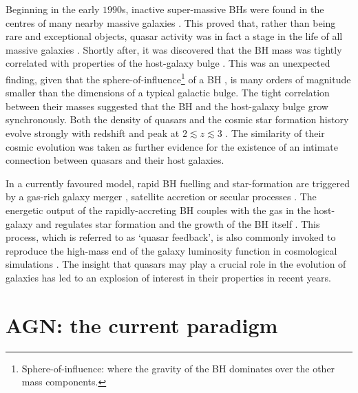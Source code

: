 Beginning in the early $1990$s, inactive super-massive BHs were found in the centres of many nearby massive galaxies \citep[e.g.][]{kormendy95,ferrarese05,kormendy13}.
This proved that, rather than being rare and exceptional objects, quasar activity was in fact a stage in the life of all massive galaxies \citep[e.g.][]{lynden-bell69}.
Shortly after, it was discovered that the BH mass was tightly correlated with properties of the host-galaxy bulge \citep[e.g. the stellar velocity dispersion, $\sigma$, which is proportional to the bulge mass; e.g.][]{magorrian98,ferrarese00,gebhardt00,graham01,tremaine02,marconi03,aller07,gultekin09}.
This was an unexpected finding, given that the sphere-of-influence\footnote{Sphere-of-influence: where the gravity of the BH dominates over the other mass components.} of a BH \citep[$\lesssim100$ parsecs; e.g.][]{kormendy13}, is many orders of magnitude smaller than the dimensions of a typical galactic bulge.
The tight correlation between their masses suggested that the BH and the host-galaxy bulge grow synchronously.
Both the density of quasars and the cosmic star formation history evolve strongly with redshift and peak at $2 \lesssim z \lesssim 3$ \citep[e.g.][]{boyle98,brandt05,richards06b}.
The similarity of their cosmic evolution was taken as further evidence for the existence of an intimate connection between quasars and their host galaxies.

In a currently favoured model, rapid BH fuelling and star-formation are triggered by a gas-rich galaxy merger \citep[e.g.][]{hopkins06a}, satellite accretion or secular processes \citep[e.g.][]{fanidakis12}.
The energetic output of the rapidly-accreting BH couples with the gas in the host-galaxy and regulates star formation and the growth of the BH itself \citep[e.g.][]{silk98,king03,dimatteo05,king15}.
This process, which is referred to as `quasar feedback', is also commonly invoked to reproduce the high-mass end of the galaxy luminosity function in cosmological simulations \citep[e.g.][]{kauffmann00}.
The insight that quasars may play a crucial role in the evolution of galaxies has led to an explosion of interest in their properties in recent years.

\section{AGN: the current paradigm}

